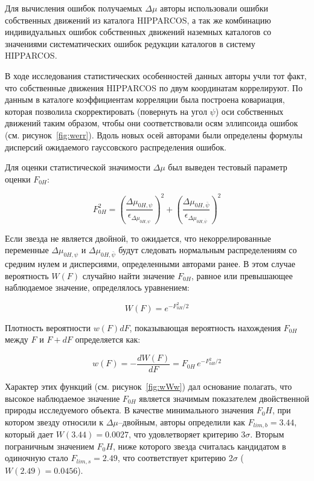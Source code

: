Для вычисления ошибок получаемых $\Delta\mu$ авторы использовали ошибки собственных движений из каталога HIPPARCOS, а так же комбинацию индивидуальных ошибок собственных движений наземных каталогов со значениями систематических ошибок редукции каталогов в систему HIPPARCOS.

В ходе исследования статистических особенностей данных авторы учли тот факт, что собственные движения HIPPARCOS по двум координатам коррелируют. По данным в каталоге коэффициентам корреляции была построена ковариация, которая позволила скорректировать (повернуть на угол $\psi$) оси собственных движений таким образом, чтобы они соответствовали осям эллипсоида ошибок (см. рисунок~\ref{fig:werr}). Вдоль новых осей авторами были определены формулы дисперсий ожидаемого гауссовского распределения ошибок.

Для оценки статистической значимости $\Delta\mu$ был выведен тестовый  параметр оценки $F_{0H}$:

\begin{equation}
  \label{eq:WiF}
  F^{2}_{0H} =(\frac{\Delta\mu_{0H,\psi}}{\epsilon_{\Delta\mu_{0H,\psi}}})^{2}+(\frac{\Delta\mu_{0H,\bar{\psi}}}{\epsilon_{\Delta\mu_{0H,\bar{\psi}}}})^{2}
\end{equation}

Если звезда не является двойной, то ожидается, что некоррелированные переменные $\Delta\mu_{0H,\psi}$ и  $\Delta\mu_{0H,\bar{\psi}}$ будут следовать нормальным распределениям со средним нулем и дисперсиями, определенными авторами ранее. В этом случае вероятность $W(F)$ случайно найти значение $F_{0H}$, равное или превышающее наблюдаемое значение, определялось уравнением:

\begin{equation}
  \label{eq:WiW}
  W(F) = e^{-F^2_{0H}/2}
\end{equation}

Плотность вероятности $w(F)dF$, показывающая вероятность нахождения $F_{0H}$ между $F$ и $F+dF$ определяется как:

\begin{equation}
  \label{eq:Wiww}
  w(F) = -\frac{dW(F)}{dF} = F_{0H}\,e^{-F^2_{0H}/2}
\end{equation}

Характер этих функций (см. рисунок~\ref{fig:wWw}) дал основание полагать, что высокое наблюдаемое значение $F_{0H}$ является значимым показателем двойственной природы исследуемого объекта. В качестве минимального значения $F_0H$, при котором звезду относили к $\Delta\mu$--двойным, авторы определили как $F_{lim,b}=3.44$, который дает $W(3.44)=0.0027$, что удовлетворяет критерию 3$\sigma$. Вторым пограничным значением $F_0H$, ниже которого звезда считалась кандидатом в одиночную стало $F_{lim,s}=2.49$, что соответствует критерию 2$\sigma$ ($W(2.49)=0.0456$).

